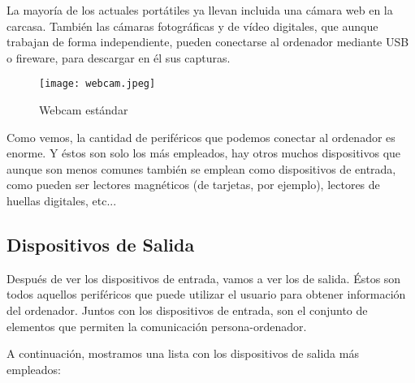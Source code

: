 \begin{itemize}
    La mayoría de los actuales portátiles ya llevan incluida una cámara web en la carcasa. También las cámaras fotográficas y de vídeo digitales, que aunque trabajan de forma independiente, pueden conectarse al ordenador mediante USB o fireware, para descargar en él sus capturas.

     \begin{figure}[ht]
        \centering
        \texttt{[image: webcam.jpeg]}
        \caption{Webcam estándar}
    \end{figure}
\end{itemize}

Como vemos, la cantidad de periféricos que podemos conectar al ordenador es enorme. Y éstos son solo los más empleados, hay otros muchos dispositivos que aunque son menos comunes también se emplean como dispositivos de entrada, como pueden ser lectores magnéticos (de tarjetas, por ejemplo), lectores de huellas digitales, etc...

\subsection{Dispositivos de Salida}
Después de ver los dispositivos de entrada, vamos a ver los de salida. Éstos son todos aquellos periféricos que puede utilizar el usuario para obtener información del ordenador. Juntos con los dispositivos de entrada, son el conjunto de elementos que permiten la comunicación persona-ordenador.

A continuación, mostramos una lista con los dispositivos de salida más empleados:

